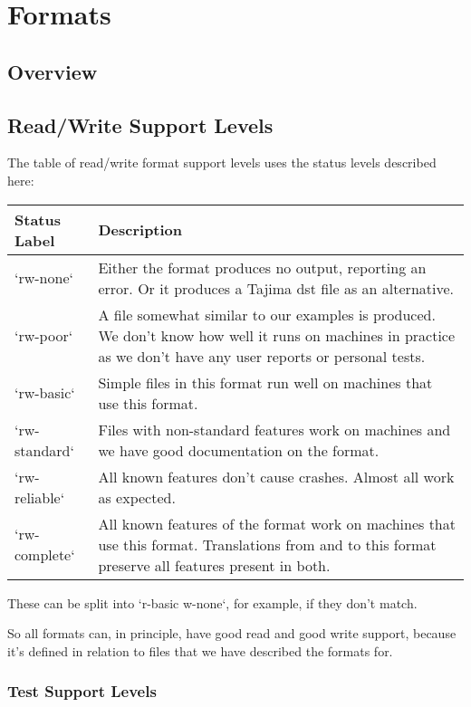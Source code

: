 
\chapter{Formats}

\section{Overview}

\section{Read/Write Support Levels}

The table of read/write format support levels uses the status levels described here:

\begin{longtable}{l p{8cm}}
Status Label & Description \\
\hline
`rw-none` & Either the format produces no output, reporting an error. Or it produces a Tajima dst file as an alternative. \\
`rw-poor` & A file somewhat similar to our examples is produced. We don't know how well it runs on machines in practice as we don't have any user reports or personal tests. \\
`rw-basic` & Simple files in this format run well on machines that use this format. \\
`rw-standard` & Files with non-standard features work on machines and we have good documentation on the format. \\
`rw-reliable` & All known features don't cause crashes. Almost all work as expected. \\
`rw-complete` & All known features of the format work on machines that use this format. Translations from and to this format preserve all features present in both.
\end{longtable}

These can be split into `r-basic w-none`, for example, if they don't match.

So all formats can, in principle, have good read and good write support, because it's defined in relation to files that we have described the formats for.

\subsection{Test Support Levels}

